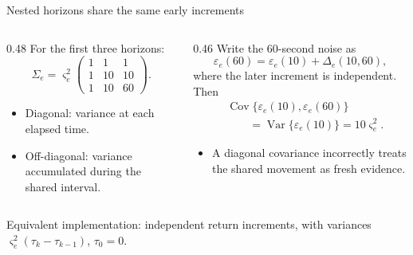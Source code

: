\documentclass[aspectratio=169,11pt]{beamer}
\newcommand{\source}[1]{\par\vfill{\scriptsize\color{muted}#1}\par}
\begin{document}
\begin{frame}{Nested horizons share the same early increments}
\begin{columns}[T,onlytextwidth]
\begin{column}{0.48\textwidth}
For the first three horizons:
\[\Sigma_e=\varsigma_e^2\begin{pmatrix}1&1&1\\1&10&10\\1&10&60\end{pmatrix}.\]
\begin{itemize}
\item Diagonal: variance at each elapsed time.
\item Off-diagonal: variance accumulated during the shared interval.
\end{itemize}\end{column}
\begin{column}{0.46\textwidth}
Write the 60-second noise as
\[\varepsilon_e(60)=\varepsilon_e(10)+\Delta_e(10,60),\]
where the later increment is independent. Then
\[\begin{aligned}
&\operatorname{Cov}\{\varepsilon_e(10),\varepsilon_e(60)\}\\
&\qquad=\operatorname{Var}\{\varepsilon_e(10)\}=10\varsigma_e^2.
\end{aligned}\]
\begin{itemize}\item A diagonal covariance incorrectly treats the shared movement as fresh evidence.\end{itemize}
\end{column}\end{columns}
\source{Equivalent implementation: independent return increments, with variances $\varsigma_e^2(\tau_k-\tau_{k-1})$, $\tau_0=0$.}
\end{frame}
\end{document}
